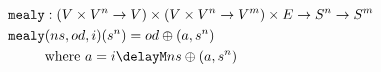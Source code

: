 \documentclass[preview]{standalone}
\begin{document}
\begin{align*}
  \texttt{mealy} &: (V \times V^n \rightarrow V) \times (V \times V^n  \rightarrow V^m) \times E
                   \rightarrow S^n \rightarrow S^m \\
  \texttt{mealy} &(ns,od,i)(s^n) = od \oplus (a,s^n) \\
                 &\text{where}\ a = i \delayM ns \oplus (a, s^n)
\end{align*}
\end{document}
